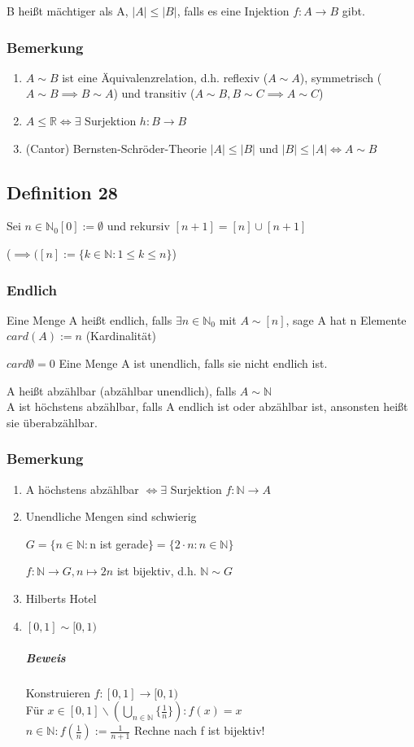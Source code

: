\documentclass[fleqn]{scrbook}
\newcommand{\R}{\mathbb{R}}
\newcommand{\N}{\mathbb{N}}
\begin{document}
B heißt mächtiger als A, $|A| \leq |B|$, falls es eine Injektion $f: A \rightarrow B$ gibt.

\subsubsection{Bemerkung}
\begin{enumerate}[1)]
\item $A \sim B$ ist eine Äquivalenzrelation, d.h. reflexiv ($A \sim A$), symmetrisch ($A \sim B \implies B \sim A$) und transitiv ($A \sim B, B \sim C \implies A \sim C$)
\item $A \leq \R \iff \exists$ Surjektion $h: B \rightarrow B$
\item (Cantor) Bernsten-Schröder-Theorie $|A| \leq |B|$ und $|B| \leq |A| \iff A \sim B$
\end{enumerate}
\subsection{Definition 28}

Sei $n \in \N_0 [0] := \emptyset$ und rekursiv $[n + 1] = [n] \cup [n+1]$

($\implies([n]:=\{k \in \N: 1\leq k \leq n \}$)

\subsubsection{Endlich} Eine Menge A heißt endlich, falls $\exists n \in \N_0$ mit $A \sim [n]$, sage A hat n Elemente $card(A) := n$ (Kardinalität)

$card\emptyset = 0$ Eine Menge A ist unendlich, falls sie nicht endlich ist.

 A heißt abzählbar (abzählbar unendlich), falls $A \sim \N$\\A ist höchstens abzählbar, falls A endlich ist oder abzählbar ist, ansonsten heißt sie überabzählbar.
\subsubsection{Bemerkung}
\begin{enumerate}[1)]
\item A höchstens abzählbar $\iff \exists$ Surjektion $f: \N \rightarrow A$
\item Unendliche Mengen sind schwierig

$G = \{ n \in \N: $n ist gerade$\} = \{2 \cdot n: n \in \N\}$

$f:\N\rightarrow G, n \mapsto 2n$ ist bijektiv, d.h. $\N \sim G$
\item Hilberts Hotel
\item $[0,1]\sim [0,1)$
\subparagraph{Beweis} Konstruieren $f: [0,1] \rightarrow [0,1)$\\Für $x \in [0,1]\backslash (\bigcup_{n\in\N} \{\frac{1}{n}\}):f(x)=x$\\$n\in\N:f(\frac{1}{n}):=\frac{1}{n+1}$ Rechne nach f ist bijektiv!
\end{enumerate}
\end{document}
